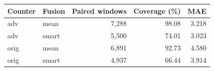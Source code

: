 \begin{tabular}{llrrr}\toprule Counter & Fusion & Paired windows & Coverage (\%) & MAE\\\midrule
adv & mean & 7,288 & 98.08 & 3.218\\
adv & smart & 5,500 & 74.01 & 3.023\\
orig & mean & 6,891 & 92.73 & 4.580\\
orig & smart & 4,937 & 66.44 & 3.914\\
\bottomrule\end{tabular}